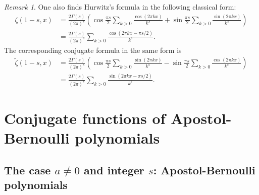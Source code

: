 \documentclass[11pt,a4paper,reqno]{amsart}
\let\tilde\widetilde
\theoremstyle{plain}
\theoremstyle{remark}
\newtheorem{remark}{Remark}
\numberwithin{equation}{section}
\begin{document}
\begin{remark} 
One also finds Hurwitz's formula in the following classical form: 
\begin{equation*}
\begin{aligned}
  \zeta(1-s,x) &= \frac{2\Gamma(s)}{(2 \pi)^s}
  \left( \cos\frac{\pi s}{2}\sum_{k>0}\frac{\cos(2\pi kx)}{k^s}
  + \sin\frac{\pi s}{2} \sum_{k>0} \frac{\sin(2\pi kx)}{k^s} \right)
  \\
  &= \frac{2\Gamma(s)}{(2 \pi)^s}\sum_{k>0}\frac{\cos(2\pi kx-\pi s/2)}{k^s}.
\end{aligned}
\end{equation*}
The corresponding conjugate formula in the same form is
\begin{equation}
\label{eq:FHconjsenoscosenos}
\begin{aligned}
  \tilde{\zeta}(1-s,x) &= \frac{2\Gamma(s)}{(2 \pi)^s}
  \left( \cos\frac{\pi s}{2}\sum_{k>0}\frac{\sin(2\pi kx)}{k^s}
  - \sin\frac{\pi s}{2} \sum_{k>0} \frac{\cos(2\pi kx)}{k^s} \right)
  \\
  &= \frac{2\Gamma(s)}{(2 \pi)^s} \sum_{k>0} \frac{\sin(2\pi kx-\pi s/2)}{k^s}.
\end{aligned}
\end{equation}
\end{remark}

\section{Conjugate functions of Apostol-Bernoulli polynomials}
\label{sec:ABconjugate}

\subsection{The case \texorpdfstring{$a\not=0$}{a!=0} and integer \texorpdfstring{$s$}{s}: Apostol-Bernoulli polynomials}
\label{subsec:ApBer}
\end{document}
